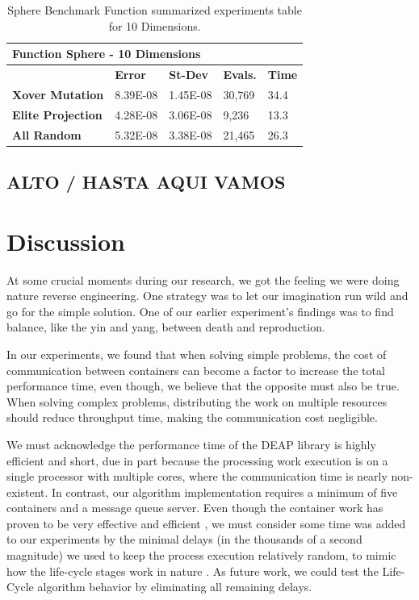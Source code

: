 \documentclass[graybox]{svmult}
\begin{document}
\begin{table}[]
    \scriptsize
    \centering
    \caption{Sphere Benchmark Function summarized experiments table for 10 Dimensions.}\label{tab.fun_sphere10}
    \begin{tabular}{@{}lllll@{}}
    \toprule
    \multicolumn{5}{l}{\textbf{Function Sphere - 10 Dimensions}} \\ \midrule
     & \textbf{Error} & \textbf{St-Dev} & \textbf{Evals.} & \textbf{Time} \\
    \textbf{Xover Mutation} & 8.39E-08 & 1.45E-08 & 30,769 & 34.4 \\
    \textbf{Elite Projection} & 4.28E-08 & 3.06E-08 & 9,236 & 13.3 \\
    \textbf{All Random} & 5.32E-08 & 3.38E-08 & 21,465 & 26.3 \\ \bottomrule
    \end{tabular}
    \end{table}

\subsection{ALTO / HASTA AQUI VAMOS}

\section{Discussion}
\label{section.discussion}

At some crucial moments during our research, we got the feeling we were doing
nature reverse engineering. One strategy was to let our imagination run wild
and go for the simple solution. One of our earlier experiment's findings was to
find balance, like the yin and yang, between death and reproduction.

In our experiments, we found that when solving simple problems, the cost of
communication between containers can become a factor to increase the total
performance time, even though, we believe that the opposite must also be true.
When solving complex problems, distributing the work on multiple resources
should reduce throughput time, making the communication cost negligible.

We must acknowledge the performance time of the DEAP library
\cite{fortin2012deap} is highly efficient and short, due in part because the
processing work execution is on a single processor with multiple cores, where
the communication time is nearly non-existent. In contrast, our algorithm
implementation requires a minimum of five containers and a message queue
server. Even though the container work has proven to be very effective and
efficient \cite{merelo2016performance,valdez2021container}, we must consider
some time was added to our experiments by the minimal delays (in the thousands
of a second magnitude) we used to keep the process execution relatively random,
to mimic how the life-cycle stages work in nature \cite{read1968system}. As
future work, we could test the Life-Cycle algorithm behavior by eliminating all
remaining delays.
\end{document}
